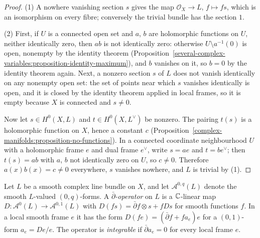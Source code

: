\begin{proof}
(1) A nowhere vanishing section $s$ gives the map $\mathcal{O}_X \to L$, $f \mapsto fs$, which is an isomorphism on every fibre; conversely the trivial bundle has the section $1$.

(2) First, if $U$ is a connected open set and $a$, $b$ are holomorphic functions on $U$, neither identically zero, then $ab$ is not identically zero: otherwise $U \setminus a^{-1}(0)$ is open, nonempty by the identity
theorem (Proposition~\ref{several-complex-variables:proposition-identity-maximum}), and $b$ vanishes on it, so $b = 0$ by the identity theorem again. Next, a nonzero section $s$ of $L$ does not vanish identically on any
nonempty open set: the set of points near which $s$ vanishes identically is open, and it is closed by the identity theorem applied in local frames, so it is empty because $X$ is connected and $s \neq 0$.

Now let $s \in H^0(X, L)$ and $t \in H^0(X, L^\vee)$ be nonzero. The pairing $t(s)$ is a holomorphic function on $X$, hence a constant $c$ (Proposition~\ref{complex-manifolds:proposition-no-functions}). In a
connected coordinate neighbourhood $U$ with a holomorphic frame $e$ and dual frame $e^\vee$, write $s = ae$ and $t = be^\vee$; then $t(s) = ab$ with $a$, $b$ not identically zero on $U$, so $c \neq 0$. Therefore
$a(x)b(x) = c \neq 0$ everywhere, $s$ vanishes nowhere, and $L$ is trivial by (1).
\end{proof}

\begin{definition}\label{holomorphic-bundles:definition-dbar-operator}
Let $L$ be a smooth complex line bundle on $X$, and let $\mathcal{A}^{0,q}(L)$ denote the smooth $L$-valued $(0,q)$-forms. A \emph{$\bar\partial$-operator} on $L$ is a $\mathbb{C}$-linear map
$D \colon \mathcal{A}^0(L) \to \mathcal{A}^{0,1}(L)$ with $D(fs) = \bar\partial f \otimes s + fDs$ for smooth functions $f$. In a local smooth frame $e$ it has the form $D(fe) = (\bar\partial f + fa_e)e$ for a
$(0,1)$-form $a_e = De/e$. The operator is \emph{integrable} if $\bar\partial a_e = 0$ for every local frame $e$.
\end{definition}

